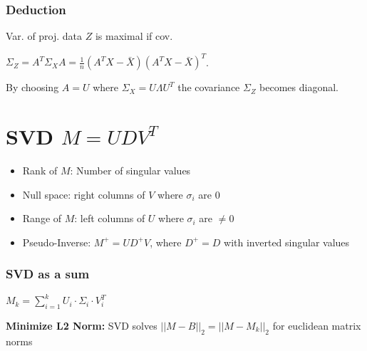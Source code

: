 \documentclass[11pt,twocolumn]{article}
\begin{document}
\subsubsection{Deduction} 
Var. of proj. data $Z$ is maximal if cov.

$\Sigma_Z = A^T \Sigma_X A = \frac{1}{n} (A^TX - \bar{X})(A^TX - \bar{X})^T $.

By choosing $A = U$ where $\Sigma_X = U \Lambda U^T$ the covariance $\Sigma_Z$ becomes diagonal.


\section{SVD $M = U D V^T$}

\begin{itemize}


\item Rank of $M$: Number of singular values
\item Null space: right columns of $V$ where $\sigma_i$ are 0
\item Range of $M$: left columns of $U$ where $\sigma_i$ are $\neq 0$
\item Pseudo-Inverse: $M^+ = U D^+ V$, where $D^+ = D$ with inverted singular values

\end{itemize}

\subsubsection{SVD as a sum}

$ M_k = \sum_{i=1}^{k} {U_i \cdot \Sigma_i \cdot V^T_i} $
 
\textbf{Minimize L2 Norm:}
SVD solves $|| M - B ||_2 = || M - M_k ||_2$
for euclidean matrix norms
\end{document}
